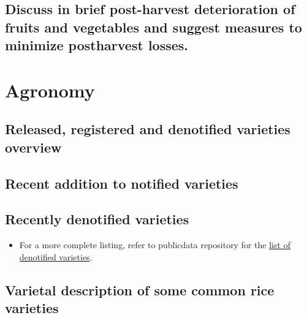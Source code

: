 \documentclass[
  openany]{book}
\providecommand{\tightlist}{%
  \setlength{\itemsep}{0pt}\setlength{\parskip}{0pt}}
\begin{document}
\hypertarget{discuss-in-brief-post-harvest-deterioration-of-fruits-and-vegetables-and-suggest-measures-to-minimize-postharvest-losses.}{%
\section{Discuss in brief post-harvest deterioration of fruits and vegetables and suggest measures to minimize postharvest losses.}\label{discuss-in-brief-post-harvest-deterioration-of-fruits-and-vegetables-and-suggest-measures-to-minimize-postharvest-losses.}}

\hypertarget{agronomy}{%
\chapter{Agronomy}\label{agronomy}}

\hypertarget{released-registered-and-denotified-varieties-overview}{%
\section{Released, registered and denotified varieties overview}\label{released-registered-and-denotified-varieties-overview}}

\hypertarget{recent-addition-to-notified-varieties}{%
\section{Recent addition to notified varieties}\label{recent-addition-to-notified-varieties}}

\hypertarget{recently-denotified-varieties}{%
\section{Recently denotified varieties}\label{recently-denotified-varieties}}

\begin{itemize}
\tightlist
\item
  For a more complete listing, refer to publicdata repository for the \href{https://raw.githubusercontent.com/DeependraD/publicdata/master/crop_varieties/denotified_varieties.csv}{list of denotified varieties}.
\end{itemize}

\hypertarget{varietal-description-of-some-common-rice-varieties}{%
\section{Varietal description of some common rice varieties}\label{varietal-description-of-some-common-rice-varieties}}
\end{document}
